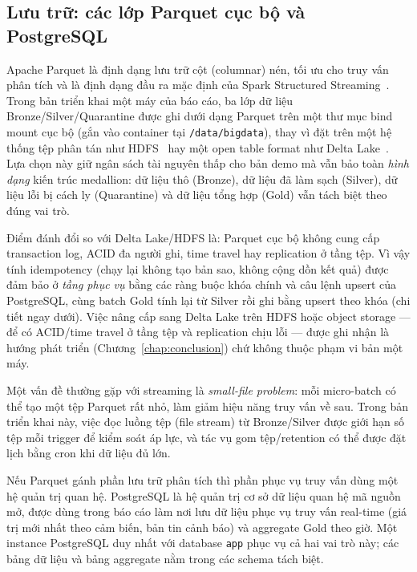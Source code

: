 \subsection{Lưu trữ: các lớp Parquet cục bộ và PostgreSQL}

Apache Parquet là định dạng lưu trữ cột (columnar) nén, tối ưu cho truy
vấn phân tích và là định dạng đầu ra mặc định của Spark Structured
Streaming~\cite{spark_docs_4_2}. Trong bản triển khai một máy của báo cáo,
ba lớp dữ liệu Bronze/Silver/Quarantine được ghi dưới dạng Parquet trên một
thư mục bind mount cục bộ (gắn vào container tại \texttt{/data/bigdata}),
thay vì đặt trên một hệ thống tệp phân tán như HDFS~\cite{hdfs_docs_3_5}
hay một open table format như Delta Lake~\cite{delta_lake_docs}. Lựa chọn
này giữ ngân sách tài nguyên thấp cho bản demo mà vẫn bảo toàn \emph{hình
dạng} kiến trúc medallion: dữ liệu thô (Bronze), dữ liệu đã làm sạch
(Silver), dữ liệu lỗi bị cách ly (Quarantine) và dữ liệu tổng hợp (Gold)
vẫn tách biệt theo đúng vai trò.

Điểm đánh đổi so với Delta Lake/HDFS là: Parquet cục bộ không cung cấp
transaction log, ACID đa người ghi, time travel hay replication ở tầng tệp.
Vì vậy tính idempotency (chạy lại không tạo bản sao, không cộng dồn kết
quả) được đảm bảo ở \emph{tầng phục vụ} bằng các ràng buộc khóa chính và
câu lệnh upsert của PostgreSQL, cùng batch Gold tính lại từ Silver rồi ghi
bằng upsert theo khóa (chi tiết ngay dưới). Việc nâng cấp sang Delta
Lake trên HDFS hoặc object storage --- để có ACID/time travel ở tầng tệp và
replication chịu lỗi --- được ghi nhận là hướng phát triển
(Chương~\ref{chap:conclusion}) chứ không thuộc phạm vi bản một máy.

Một vấn đề thường gặp với streaming là \textit{small-file problem}: mỗi
micro-batch có thể tạo một tệp Parquet rất nhỏ, làm giảm hiệu năng truy
vấn về sau. Trong bản triển khai này, việc đọc luồng tệp (file stream) từ
Bronze/Silver được giới hạn số tệp mỗi trigger để kiểm soát áp lực, và tác
vụ gom tệp/retention có thể được đặt lịch bằng cron khi dữ liệu đủ lớn.

Nếu Parquet gánh phần lưu trữ phân tích thì phần phục vụ truy vấn dùng một
hệ quản trị quan hệ. PostgreSQL là hệ quản trị cơ sở dữ liệu quan hệ mã
nguồn mở, được dùng
trong báo cáo làm nơi lưu dữ liệu phục vụ truy vấn real-time (giá trị mới
nhất theo cảm biến, bản tin cảnh báo) và aggregate Gold theo giờ. Một
instance PostgreSQL duy nhất với database \texttt{app} phục vụ cả hai vai trò
này; các bảng dữ liệu và bảng aggregate nằm trong các schema tách biệt.

